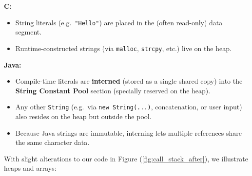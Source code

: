 \begin{Def}
    \noindent
    \textbf{C:}  
    \begin{itemize}
      \item String literals (e.g.\ \texttt{"Hello"}) are placed in the (often read-only) data segment.
      \item Runtime-constructed strings (via \texttt{malloc}, \texttt{strcpy}, etc.) live on the heap.
    \end{itemize}

    \noindent
    \textbf{Java:}  
    \begin{itemize}
      \item Compile-time literals are \textbf{interned} (stored as a single shared copy) into the \textbf{String Constant Pool} section (specially reserved on the heap).  
      \item Any other \texttt{String} (e.g.\ via \texttt{new String(...)}, concatenation, or user input) also resides on the heap but outside the pool.  
      \item Because Java strings are immutable, interning lets multiple references share the same character data.
    \end{itemize}

    
\end{Def}

\newpage

\noindent
With slight alterations to our code in Figure (\ref{fig:call_stack_after}), we illustrate heaps and arrays:

